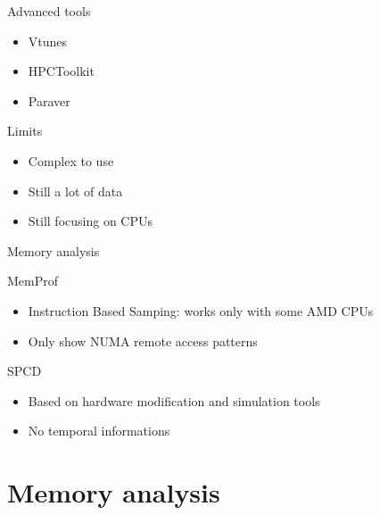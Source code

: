 \documentclass[xcolor={usenames,dvipsnames}]{beamer}
\newcommand{\sectiontitle}{}
\newcommand{\newsection}[1]{\renewcommand{\sectiontitle}{#1}\section{#1}}
\begin{document}
\begin{frame}{Advanced tools}
    \begin{itemize}
        \item Vtunes \cite{Reinders05VTune}
        \item HPCToolkit \cite{Adhianto10HPCTOOLKIT}
        \item Paraver \cite{Pillet95PARAVER}
    \end{itemize}
    \pause
    \begin{alertblock}{Limits}
        \begin{itemize}
            \item Complex to use
            \item Still a lot of data
            \item Still focusing on CPUs
        \end{itemize}
    \end{alertblock}
\end{frame}

\begin{frame}{Memory analysis}
    \begin{block}{MemProf \cite{Lachaize12MemProf}}
        \begin{itemize}
            \item Instruction Based Samping: works only with some AMD CPUs
            \item Only show NUMA remote access patterns
        \end{itemize}
    \end{block}
    \pause
    \begin{block}{SPCD \cite{Cruz12Using,Cruz12Using,Cruz14Dynamic} }
        \begin{itemize}
            \item Based on hardware modification and simulation tools
            \item No temporal informations
        \end{itemize}
    \end{block}
\end{frame}

\newsection{Memory analysis}
\end{document}

